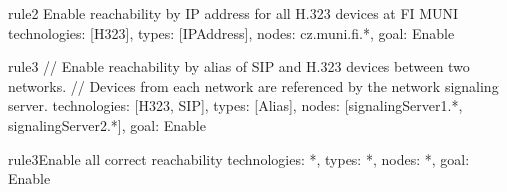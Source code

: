 \begin{EntityExample}{}{rule2}%
      {Enable reachability by IP address for all H.323 devices at FI MUNI}
technologies: [H323],
types: [IPAddress],
nodes: cz.muni.fi.*,
goal: Enable
\end{EntityExample}

\begin{EntityExample}{}{rule3}{}
// Enable reachability by alias of SIP and H.323 devices between two networks.
// Devices from each network are referenced by the network signaling server.
technologies: [H323, SIP],
types: [Alias],
nodes: [signalingServer1.*, signalingServer2.*],
goal: Enable
\end{EntityExample}

\begin{EntityExample}{}{rule3}{Enable all correct reachability}
technologies: *,
types: *,
nodes: *,
goal: Enable
\end{EntityExample}


      





